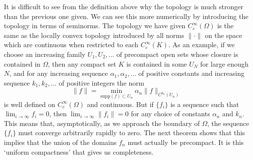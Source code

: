 It is difficult to see from the definition above why the topology is much stronger than the previous one given. We can see this more numerically by introducing the topology in terms of seminorms. The topology we have given $C_c^\infty(\Omega)$ is the same as the locally convex topology introduced by all norms $\| \cdot \|$ on the space which are continuous when restricted to each $C_c^\infty(K)$. As an example, if we choose an increasing family $U_1, U_2, \dots$ of precompact open sets whose closure is contained in $\Omega$, then any compact set $K$ is contained in some $U_N$ for large enough $N$, and for any increasing sequence $\alpha_1, \alpha_2, \dots$ of positive constants and increasing sequence $k_1, k_2, \dots$ of positive integers the norm
%
\[ \| f \| = \min_{\text{supp}(f) \subset U_n} \alpha_n \| f \|_{C^{k_n}(U_n)} \]
%
is well defined on $C_c^\infty(\Omega)$ and continuous. But if $\{ f_i \}$ is a sequence such that $\lim_{i \to \infty} f_i = 0$, then $\lim_{i \to \infty} \| f_i \| = 0$ for any choice of constants $\alpha_n$ and $k_n$. This means that, asymptotically, as we approach the boundary of $\Omega$, the sequence $\{ f_i \}$ must converge arbitrarily rapidly to zero. The next theorem shows that this implies that the union of the domains $f_n$ must actually be precompact. It is this `uniform compactness' that gives us completeness.

